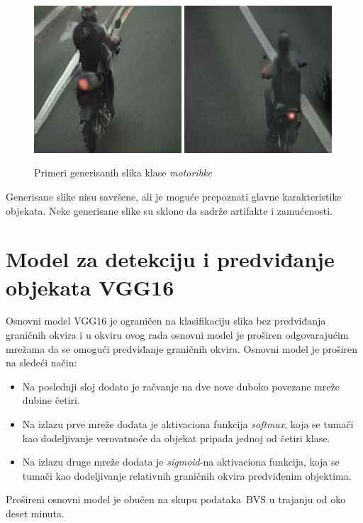 \documentclass[12pt,oneside]{memoir}
\newcommand{\bvs}{\ensuremath{\,\textrm{BVS}}}
\begin{document}
\begin{figure}[!htbp]
\centering
    \includegraphics[width=0.49\textwidth]{matfmaster/stylegan/motorbike/image2.png}
    \includegraphics[width=0.49\textwidth]{matfmaster/stylegan/motorbike/image9.png}
\caption{Primeri generisanih slika klase \textit{motoribke}}
\label{fig:section4_stylegan_motorbike_images}
\end{figure}

Generisane slike nisu savršene, ali je moguće prepoznati glavne karakteristike objekata. Neke generisane slike su sklone da sadrže artifakte i zamućenosti.


\section{Model za detekciju i predviđanje objekata VGG16}

Osnovni model VGG16 je ograničen na klasifikaciju slika bez predviđanja graničnih okvira i u okviru ovog rada osnovni model je proširen odgovarajućim mrežama da se omogući predviđanje graničnih okvira. Osnovni model je proširen na sledeći način:
\begin{itemize}
\item Na poslednji sloj dodato je račvanje na dve nove duboko povezane mreže dubine četiri.
\item Na izlazu prve mreže dodata je aktivaciona funkcija \textit{softmax}, koja se tumači kao dodeljivanje verovatnoće da objekat pripada jednoj od četiri klase.
\item Na izlazu druge mreže dodata je \textit{sigmoid}-na aktivaciona funkcija, koja se tumači kao dodeljivanje relativnih graničnih okvira predviđenim objektima.
\end{itemize}
Prošireni osnovni model je obučen na skupu podataka \bvs{} u trajanju od oko deset minuta.
\end{document}
